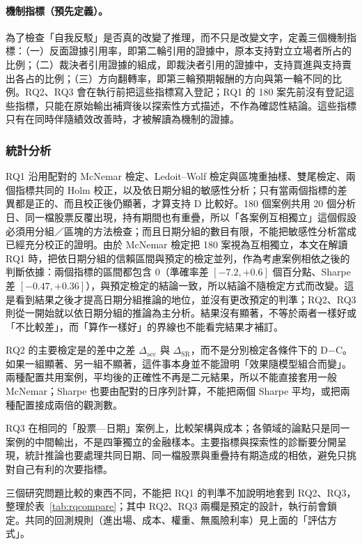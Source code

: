 \paragraph{機制指標（預先定義）。} 為了檢查「自我反駁」是否真的改變了推理，而不只是改變文字，定義三個機制指標：（一）反面證據引用率，即第二輪引用的證據中，原本支持對立立場者所占的比例；（二）裁決者引用證據的組成，即裁決者引用的證據中，支持買進與支持賣出各占的比例；（三）方向翻轉率，即第三輪預期報酬的方向與第一輪不同的比例。RQ2、RQ3 會在執行前把這些指標寫入登記；RQ1 的 180 案先前沒有登記這些指標，只能在原始輸出補齊後以探索性方式描述，不作為確認性結論。這些指標只有在同時伴隨績效改善時，才被解讀為機制的證據。

\subsubsection{統計分析}

RQ1 沿用配對的 McNemar 檢定、Ledoit--Wolf 檢定與區塊重抽樣、雙尾檢定、兩個指標共同的 Holm 校正，以及依日期分組的敏感性分析；只有當兩個指標的差異都是正的、而且校正後仍顯著，才算支持 D 比較好。180 個案例共用 20 個分析日、同一檔股票反覆出現，持有期間也有重疊，所以「各案例互相獨立」這個假設必須用分組／區塊的方法檢查；而且日期分組的數目有限，不能把敏感性分析當成已經充分校正的證明。由於 McNemar 檢定把 180 案視為互相獨立，本文在解讀 RQ1 時，把依日期分組的信賴區間與預定的檢定並列，作為考慮案例相依之後的判斷依據：兩個指標的區間都包含 0（準確率差 $[-7.2,+0.6]$ 個百分點、Sharpe 差 $[-0.47,+0.36]$），與預定檢定的結論一致，所以結論不隨檢定方式而改變。這是看到結果之後才提高日期分組推論的地位，並沒有更改預定的判準；RQ2、RQ3 則從一開始就以依日期分組的推論為主分析。結果沒有顯著，不等於兩者一樣好或「不比較差」，而「算作一樣好」的界線也不能看完結果才補訂。

RQ2 的主要檢定是的差中之差 $\Delta_{\mathrm{acc}}$ 與 $\Delta_{\mathrm{SR}}$，而不是分別檢定各條件下的 D$-$C。如果一組顯著、另一組不顯著，這件事本身並不能證明「效果隨模型組合而變」。兩種配置共用案例，平均後的正確性不再是二元結果，所以不能直接套用一般 McNemar；Sharpe 也要由配對的日序列計算，不能把兩個 Sharpe 平均，或把兩種配置接成兩倍的觀測數。

RQ3 在相同的「股票—日期」案例上，比較架構與成本；各領域的論點只是同一案例的中間輸出，不是四筆獨立的金融樣本。主要指標與探索性的診斷要分開呈現，統計推論也要處理共同日期、同一檔股票與重疊持有期造成的相依，避免只挑對自己有利的次要指標。

三個研究問題比較的東西不同，不能把 RQ1 的判準不加說明地套到 RQ2、RQ3，整理於表~\ref{tab:rqcompare}；其中 RQ2、RQ3 兩欄是預定的設計，執行前會鎖定。共同的回測規則（進出場、成本、權重、無風險利率）見上面的「評估方式」。

